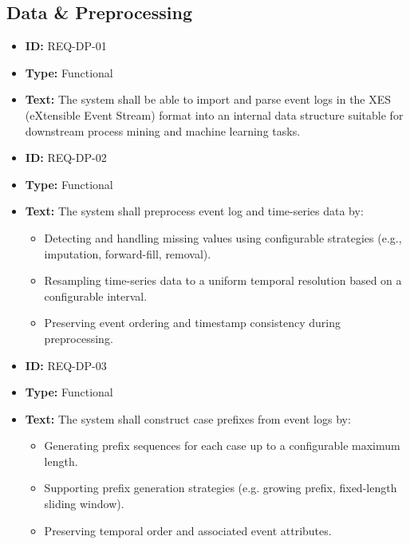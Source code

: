 \documentclass[runningheads]{llncs}
\begin{document}
\subsection{Data \& Preprocessing}
\begin{itemize}
    \item \textbf{ID:} REQ-DP-01
    \item \textbf{Type:} Functional
    \item \textbf{Text:} The system shall be able to import and parse event logs in the XES (eXtensible Event Stream) format into an internal data structure suitable for downstream process mining and machine learning tasks.

          \vspace{1em}
    \item \textbf{ID:} REQ-DP-02
    \item \textbf{Type:} Functional
    \item \textbf{Text:} The system shall preprocess event log and time-series data by:
          \begin{itemize}
              \item Detecting and handling missing values using configurable strategies (e.g., imputation, forward-fill, removal).
              \item Resampling time-series data to a uniform temporal resolution based on a configurable interval.
              \item Preserving event ordering and timestamp consistency during preprocessing.
          \end{itemize}

          \vspace{1em}
    \item \textbf{ID:} REQ-DP-03
    \item \textbf{Type:} Functional
    \item \textbf{Text:} The system shall construct case prefixes from event logs by:
          \begin{itemize}
              \item Generating prefix sequences for each case up to a configurable maximum length.
              \item Supporting prefix generation strategies (e.g. growing prefix, fixed-length sliding window).
              \item Preserving temporal order and associated event attributes.
          \end{itemize}


\end{itemize}
\end{document}
